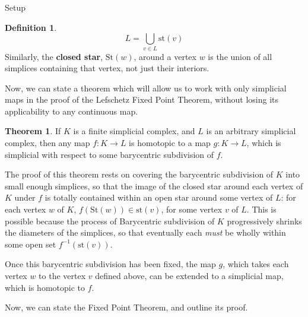 \documentclass[12pt]{article}
\theoremstyle{definition}
\newtheorem{theorem}{Theorem}
\newtheorem{definition}{Definition}
\begin{document}
\begin{section}{Setup}
\begin{definition}
	\[L = \bigcup_{v \in L} \text{st}(v) \]
	Similarly, the \textbf{ closed star}, $\text{St}(w)$, around a vertex $w$ is the union of all simplices containing that vertex, not just their interiors.
\end{definition}
Now, we can state a theorem which will allow us to work with only simplicial maps in the proof of the Lefschetz Fixed Point Theorem, without losing its applicability to any continuous map.
\begin{theorem}	
	If $K$ is a finite simplicial complex, and $L$ is an arbitrary simplicial complex, then any map $f: K \to L$ is homotopic to a map $g: K \to L$, which is simplicial with respect to some barycentric subdivision of $f$.
	\par The proof of this theorem rests on covering the barycentric subdivision of $K$ into small enough simplices, so that the image of the closed star around each vertex of $K$ under $f$ is totally contained within an open star around some vertex of $L$: for each vertex $w$ of $K$, $f(\text{St}(w)) \in \text{st}(v)$, for some vertex $v$ of $L$. This is possible because the process of Barycentric subdivision of $K$ progressively shrinks the diameters of the simplices, so that eventually each \textit{must} be wholly within some open set $f^{-1}(\text{st}(v))$.
	\par Once this barycentric subdivision has been fixed, the map $g$, which takes each vertex $w$ to the vertex $v$ defined above, can be extended to a simplicial map, which is homotopic to $f$.
\end{theorem}
	Now, we can state the Fixed Point Theorem, and outline its proof.
\end{section}
\end{document}

